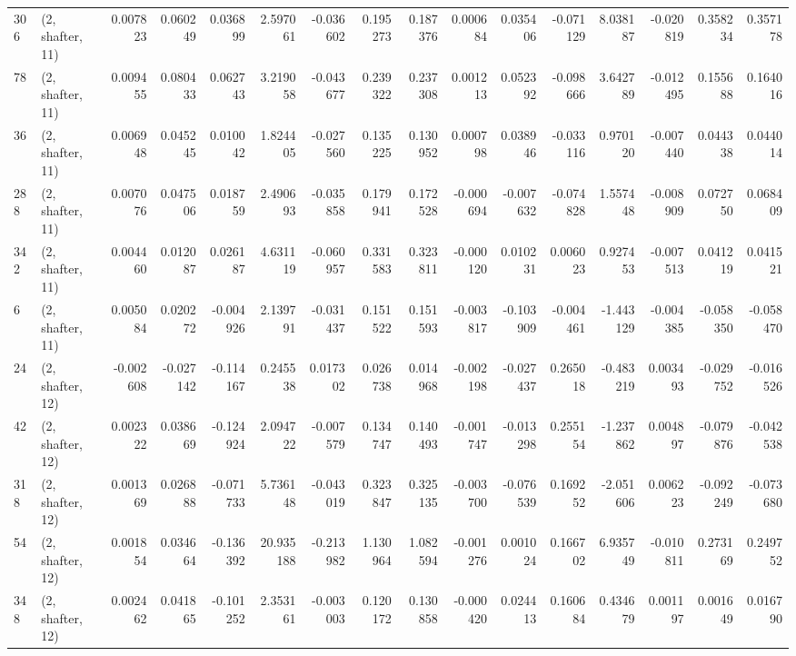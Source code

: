 \begin{tabular}{llrrrrrrrrrrrrrr}
306 &  (2, shafter, 11) &   0.007823 &  0.060249 &  0.036899 &     2.597061 &  -0.036602 &   0.195273 &   0.187376 &  0.000684 &  0.035406 & -0.071129 &    8.038187 & -0.020819 &  0.358234 &  0.357178 \\
78  &  (2, shafter, 11) &   0.009455 &  0.080433 &  0.062743 &     3.219058 &  -0.043677 &   0.239322 &   0.237308 &  0.001213 &  0.052392 & -0.098666 &    3.642789 & -0.012495 &  0.155688 &  0.164016 \\
36  &  (2, shafter, 11) &   0.006948 &  0.045245 &  0.010042 &     1.824405 &  -0.027560 &   0.135225 &   0.130952 &  0.000798 &  0.038946 & -0.033116 &    0.970120 & -0.007440 &  0.044338 &  0.044014 \\
288 &  (2, shafter, 11) &   0.007076 &  0.047506 &  0.018759 &     2.490693 &  -0.035858 &   0.179941 &   0.172528 & -0.000694 & -0.007632 & -0.074828 &    1.557448 & -0.008909 &  0.072750 &  0.068409 \\
342 &  (2, shafter, 11) &   0.004460 &  0.012087 &  0.026187 &     4.631119 &  -0.060957 &   0.331583 &   0.323811 & -0.000120 &  0.010231 &  0.006023 &    0.927453 & -0.007513 &  0.041219 &  0.041521 \\
6   &  (2, shafter, 11) &   0.005084 &  0.020272 & -0.004926 &     2.139791 &  -0.031437 &   0.151522 &   0.151593 & -0.003817 & -0.103909 & -0.004461 &   -1.443129 & -0.004385 & -0.058350 & -0.058470 \\
24  &  (2, shafter, 12) &  -0.002608 & -0.027142 & -0.114167 &     0.245538 &   0.017302 &   0.026738 &   0.014968 & -0.002198 & -0.027437 &  0.265018 &   -0.483219 &  0.003493 & -0.029752 & -0.016526 \\
42  &  (2, shafter, 12) &   0.002322 &  0.038669 & -0.124924 &     2.094722 &  -0.007579 &   0.134747 &   0.140493 & -0.001747 & -0.013298 &  0.255154 &   -1.237862 &  0.004897 & -0.079876 & -0.042538 \\
318 &  (2, shafter, 12) &   0.001369 &  0.026888 & -0.071733 &     5.736148 &  -0.043019 &   0.323847 &   0.325135 & -0.003700 & -0.076539 &  0.169252 &   -2.051606 &  0.006223 & -0.092249 & -0.073680 \\
54  &  (2, shafter, 12) &   0.001854 &  0.034664 & -0.136392 &    20.935188 &  -0.213982 &   1.130964 &   1.082594 & -0.001276 &  0.001024 &  0.166702 &    6.935749 & -0.010811 &  0.273169 &  0.249752 \\
348 &  (2, shafter, 12) &   0.002462 &  0.041865 & -0.101252 &     2.353161 &  -0.003003 &   0.120172 &   0.130858 & -0.000420 &  0.024413 &  0.160684 &    0.434679 &  0.001197 &  0.001649 &  0.016790 \\

\end{tabular}
